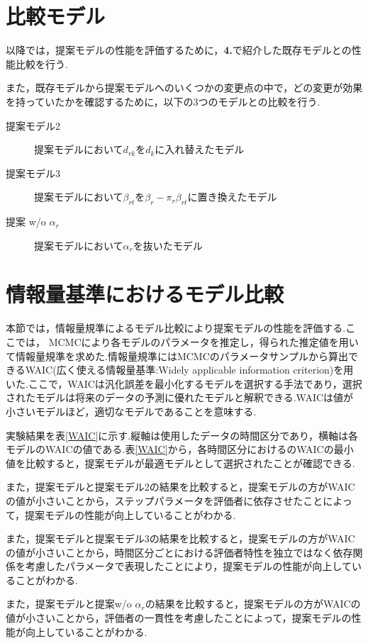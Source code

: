 \documentclass[a4paper，11pt，oneside，openany]{jsbook}
\begin{document}
\newpage
\section{比較モデル}
以降では，提案モデルの性能を評価するために，\textbf{4.}で紹介した既存モデルとの性能比較を行う.

また，既存モデルから提案モデルへのいくつかの変更点の中で，どの変更が効果を持っていたかを確認するために，以下の3つのモデルとの比較を行う.

\begin{description}
\item [提案モデル2]提案モデルにおいて$d_{rk}$を$d_k$に入れ替えたモデル
\item[提案モデル3]提案モデルにおいて$\beta_{rt}$を$\beta_{r} - \pi_{r}\beta_{rt}$に置き換えたモデル
\item[提案 w/o $\alpha_r$]提案モデルにおいて$\alpha_r$を抜いたモデル
\end{description}

\section{情報量基準におけるモデル比較}

本節では，情報量規準によるモデル比較により提案モデルの性能を評価する.ここでは， MCMCにより各モデルのパラメータを推定し，得られた推定値を用いて情報量規準を求めた.情報量規準にはMCMCのパラメータサンプルから算出できるWAIC(広く使える情報量基準:Widely applicable information criterion)を用いた.ここで，WAICは汎化誤差を最小化するモデルを選択する手法であり，選択されたモデルは将来のデータの予測に優れたモデルと解釈できる.WAICは値が小さいモデルほど，適切なモデルであることを意味する.

実験結果を表\ref{WAIC}に示す.縦軸は使用したデータの時間区分であり，横軸は各モデルのWAICの値である.表\ref{WAIC}から，各時間区分におけるのWAICの最小値を比較すると，提案モデルが最適モデルとして選択されたことが確認できる.

また，提案モデルと提案モデル2の結果を比較すると，提案モデルの方がWAICの値が小さいことから，ステップパラメータを評価者に依存させたことによって，提案モデルの性能が向上していることがわかる.

また，提案モデルと提案モデル3の結果を比較すると，提案モデルの方がWAICの値が小さいことから，時間区分ごとにおける評価者特性を独立ではなく依存関係を考慮したパラメータで表現したことにより，提案モデルの性能が向上していることがわかる.

また，提案モデルと提案w/o $\alpha_r$の結果を比較すると，提案モデルの方がWAICの値が小さいことから，評価者の一貫性を考慮したことによって，提案モデルの性能が向上していることがわかる.
\end{document}
